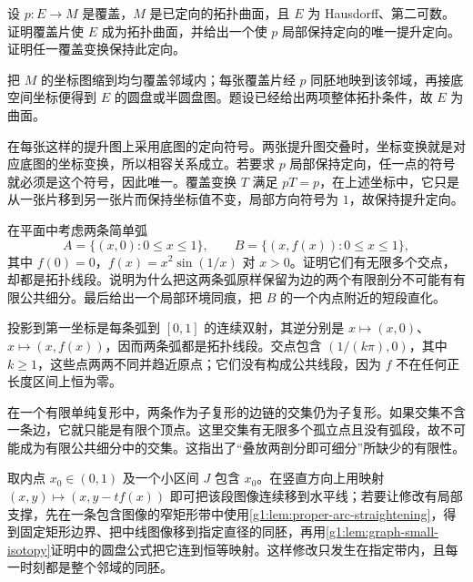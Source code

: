 \begin{exercise}\label{g1:ex:orientation-pullback-cover}
	设 \(p:E\to M\) 是覆盖，\(M\) 是已定向的拓扑曲面，且 \(E\) 为 Hausdorff、第二可数。证明覆盖片使 \(E\) 成为拓扑曲面，并给出一个使 \(p\) 局部保持定向的唯一提升定向。证明任一覆盖变换保持此定向。
\end{exercise}
\begin{solution}
	把 \(M\) 的坐标图缩到均匀覆盖邻域内；每张覆盖片经 \(p\) 同胚地映到该邻域，再接底空间坐标便得到 \(E\) 的圆盘或半圆盘图。题设已经给出两项整体拓扑条件，故 \(E\) 为曲面。

	在每张这样的提升图上采用底图的定向符号。两张提升图交叠时，坐标变换就是对应底图的坐标变换，所以相容关系成立。若要求 \(p\) 局部保持定向，任一点的符号就必须是这个符号，因此唯一。覆盖变换 \(T\) 满足 \(pT=p\)，在上述坐标中，它只是从一张片移到另一张片而保持坐标值不变，局部方向符号为 \(1\)，故保持提升定向。
\end{solution}

\begin{exercise}\label{g1:ex:oscillating-edges}
	在平面中考虑两条简单弧
	\[
		A=\{(x,0):0\le x\le1\},\qquad B=\{(x,f(x)):0\le x\le1\},
	\]
	其中 \(f(0)=0\)，\(f(x)=x^2\sin(1/x)\) 对 \(x>0\)。证明它们有无限多个交点，却都是拓扑线段。说明为什么把这两条弧原样保留为边的两个有限剖分不可能有有限公共细分。最后给出一个局部环境同痕，把 \(B\) 的一个内点附近的短段直化。
\end{exercise}
\begin{solution}
	投影到第一坐标是每条弧到 \([0,1]\) 的连续双射，其逆分别是 \(x\mapsto(x,0)\)、\(x\mapsto(x,f(x))\)，因而两条弧都是拓扑线段。交点包含 \((1/(k\pi),0)\)，其中 \(k\ge1\)，这些点两两不同并趋近原点；它们没有构成公共线段，因为 \(f\) 不在任何正长度区间上恒为零。

	在一个有限单纯复形中，两条作为子复形的边链的交集仍为子复形。如果交集不含一条边，它就只能是有限个顶点。这里交集有无限多个孤立点且没有弧段，故不可能成为有限公共细分中的交集。这指出了“叠放两剖分即可细分”所缺少的有限性。

	取内点 \(x_0\in(0,1)\) 及一个小区间 \(J\) 包含 \(x_0\)。在竖直方向上用映射 \((x,y)\mapsto(x,y-tf(x))\) 即可把该段图像连续移到水平线；若要让修改有局部支撑，先在一条包含图像的窄矩形带中使用\cref{g1:lem:proper-arc-straightening}，得到固定矩形边界、把中线图像移到指定直径的同胚，再用\cref{g1:lem:graph-small-isotopy}证明中的圆盘公式把它连到恒等映射。这样修改只发生在指定带内，且每一时刻都是整个邻域的同胚。
\end{solution}

